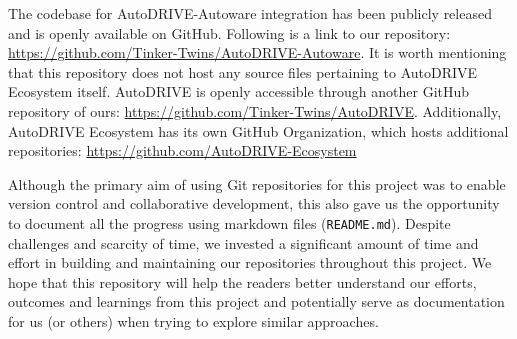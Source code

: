 The codebase for AutoDRIVE-Autoware integration has been publicly released and is openly available on GitHub. Following is a link to our repository: \href{https://github.com/Tinker-Twins/AutoDRIVE-Autoware}{https://github.com/Tinker-Twins/AutoDRIVE-Autoware}. It is worth mentioning that this repository does not host any source files pertaining to AutoDRIVE Ecosystem itself. AutoDRIVE is openly accessible through another GitHub repository of ours: \href{https://github.com/Tinker-Twins/AutoDRIVE}{https://github.com/Tinker-Twins/AutoDRIVE}. Additionally, AutoDRIVE Ecosystem has its own GitHub Organization, which hosts additional repositories: \href{https://github.com/AutoDRIVE-Ecosystem}{https://github.com/AutoDRIVE-Ecosystem}

Although the primary aim of using Git repositories for this project was to enable version control and collaborative development, this also gave us the opportunity to document all the progress using markdown files (\texttt{README.md}). Despite challenges and scarcity of time, we invested a significant amount of time and effort in building and maintaining our repositories throughout this project. We hope that this repository will help the readers better understand our efforts, outcomes and learnings from this project and potentially serve as documentation for us (or others) when trying to explore similar approaches.